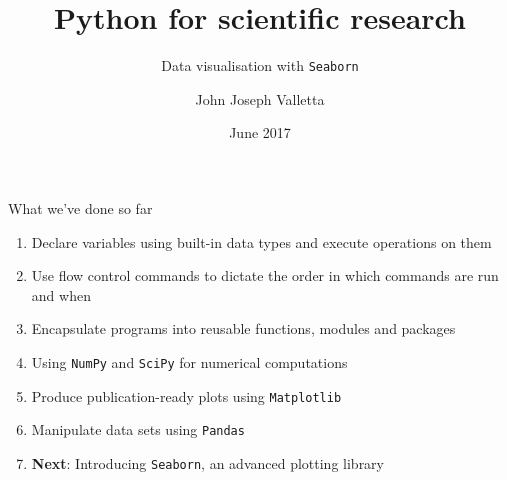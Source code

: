 \documentclass[pdf]{beamer}
\title[Python for scientific research]{Python for scientific research}
\subtitle{Data visualisation with \texttt{Seaborn}}
\author{John Joseph Valletta}
\date[June 2017]{June 2017}
\institute[]{University of Exeter, Penryn Campus, UK}
\begin{document}
\begin{frame}
\titlepage
\end{frame}

\begin{frame}{What we've done so far}

	\begin{enumerate}\addtolength{\itemsep}{.7\baselineskip}
		\item Declare variables using built-in data types and execute operations
		on them
		\item Use flow control commands to dictate the order in which commands are run
		and when
		\item Encapsulate programs into reusable functions, modules and packages
		\item Using \texttt{NumPy} and \texttt{SciPy} for numerical computations
		\item Produce publication-ready plots using \texttt{Matplotlib} 
		\item Manipulate data sets using \texttt{Pandas}
		\item \textbf{Next}: Introducing \texttt{Seaborn}, an advanced plotting library
	\end{enumerate}

\end{frame}
\end{document}
